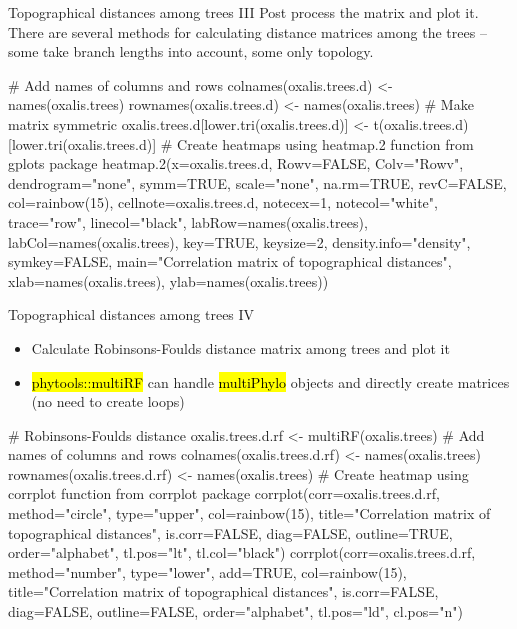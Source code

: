 \documentclass[compress, ucs, xelatex, 11pt, xcolor=svgnames,
  hyperref={
    bookmarks=true,
    unicode=true,
    colorlinks=true,
    pdftitle={Molecular data in R},
    plainpages=false,
    pdfauthor={Vojtech Zeisek},
    pdfsubject={Course about phylogeny and evolution in R},
    pdfcreator={XeLaTeX},
    pdfkeywords={R, evolution, phylogeny, molecular data},
    linkcolor=Tomato,
    anchorcolor=SaddleBrown,
    citecolor=Goldenrod,
    filecolor=DarkMagenta,
    menucolor=Sienna,
    urlcolor=DarkTurquoise,
    pdftex},
  url={hyphens, lowtilde} %
  ]{beamer}
\renewcommand{\texttt}[1]{\hl{\ttfamily #1}}
\begin{document}
\begin{frame}[fragile]{Topographical distances among trees III}
Post process the matrix and plot it. There are several methods for calculating distance matrices among the trees -- some take branch lengths into account, some only topology.
  \begin{spluscode}
    # Add names of columns and rows
    colnames(oxalis.trees.d) <- names(oxalis.trees)
    rownames(oxalis.trees.d) <- names(oxalis.trees)
    # Make matrix symmetric
    oxalis.trees.d[lower.tri(oxalis.trees.d)] <-
      t(oxalis.trees.d)[lower.tri(oxalis.trees.d)]
    # Create heatmaps using heatmap.2 function from gplots package
    heatmap.2(x=oxalis.trees.d, Rowv=FALSE, Colv="Rowv", dendrogram="none",
      symm=TRUE, scale="none", na.rm=TRUE, revC=FALSE, col=rainbow(15),
      cellnote=oxalis.trees.d, notecex=1, notecol="white", trace="row",
      linecol="black", labRow=names(oxalis.trees),
      labCol=names(oxalis.trees), key=TRUE, keysize=2,
      density.info="density", symkey=FALSE, main="Correlation matrix of
      topographical distances", xlab=names(oxalis.trees),
      ylab=names(oxalis.trees))
  \end{spluscode}
\end{frame}

\begin{frame}[fragile]{Topographical distances among trees IV}
\begin{itemize}
  \item Calculate Robinsons-Foulds distance matrix among trees and plot it
  \item \texttt{phytools::multiRF} can handle \texttt{multiPhylo} objects and directly create matrices (no need to create loops)
\end{itemize}
  \begin{spluscode}
    # Robinsons-Foulds distance
    oxalis.trees.d.rf <- multiRF(oxalis.trees)
    # Add names of columns and rows
    colnames(oxalis.trees.d.rf) <- names(oxalis.trees)
    rownames(oxalis.trees.d.rf) <- names(oxalis.trees)
    # Create heatmap using corrplot function from corrplot package
    corrplot(corr=oxalis.trees.d.rf, method="circle", type="upper",
      col=rainbow(15), title="Correlation matrix of topographical
      distances", is.corr=FALSE, diag=FALSE, outline=TRUE,
      order="alphabet", tl.pos="lt", tl.col="black")
    corrplot(corr=oxalis.trees.d.rf, method="number", type="lower",
      add=TRUE, col=rainbow(15), title="Correlation matrix of
      topographical distances", is.corr=FALSE, diag=FALSE,
      outline=FALSE, order="alphabet", tl.pos="ld", cl.pos="n")
  \end{spluscode}
\end{frame}
\end{document}
